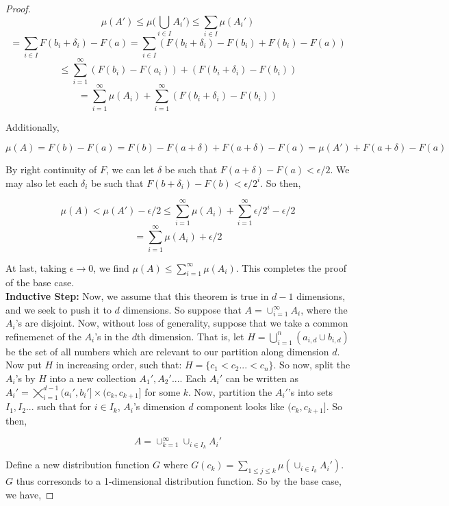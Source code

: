 \begin{proof}
   \[ \mu(A') \leq \mu\bigg(\bigcup_{i\in I}A_i' \bigg) \leq \sum_{i \in I} \mu(A_i') \] 
   \[ = \sum_{i \in I} F(b_i + \delta_i) - F(a) = \sum_{i \in I} (F(b_i + \delta_i) - F(b_i) + F(b_i) - F(a)) \]
   \[ \leq \sum_{i =1}^\infty (F(b_i) - F(a_i)) + (F(b_i + \delta_i) - F(b_i)) \] 
   \[ = \sum_{i =1}^\infty \mu(A_i) + \sum_{i =1}^\infty (F(b_i + \delta_i) - F(b_i))  \]

   Additionally, 

   \[ \mu(A) = F(b) - F(a) = F(b) - F(a + \delta) + F(a + \delta) - F(a) = \mu(A') + F(a + \delta) - F(a) \] 


   By right continuity of $F$, we can let $\delta$ be such that $F(a + \delta) - F(a) < \epsilon / 2$. 
   We may also let each $\delta_i$ be such that $F(b + \delta_i) - F(b) < \epsilon / 2^i$. So then, 

   \[ \mu(A) < \mu(A') - \epsilon/2 \leq \sum_{i =1}^\infty \mu(A_i) + \sum_{i =1}^\infty \epsilon / 2^i - \epsilon / 2 \]
   \[ = \sum_{i =1}^\infty \mu(A_i) + \epsilon / 2 \]

   At last, taking $\epsilon \to 0$, we find $\mu(A) \leq \sum_{i =1}^\infty \mu(A_i)$. This 
   completes the proof of the base case.\\

   \textbf{Inductive Step:} Now, we assume that this theorem is true in 
   $d-1$ dimensions, and we seek to push it to $d$ dimensions. So suppose that 
   $A = \cup_{i=1}^\infty A_i$, where the $A_i$'s are disjoint. Now, without loss of generality, 
   suppose that we take a common refinemenet of the $A_i$'s in the $d$th dimension. That is, 
   let $H = \bigcup_{i=1}^n (a_{i,d} \cup b_{i,d})$ be the set of all numbers which are relevant 
   to our partition along dimension $d$. Now put $H$ in increasing order, such that: 
   $H = \{c_1 < c_2... < c_n\}$. So now, split the $A_i$'s by $H$ into a new collection 
   $A_1', A_2'...$. Each $A_i'$ can be written as $A_i' = \bigtimes_{i=1}^{d-1} (a_i', b_i'] \times (c_k, c_{k+1}]$ 
   for some $k$. Now, partition the $A_i'$'s into sets $I_1, I_2...$ such that 
   for $i \in I_k$, $A_i$'s dimension $d$ component looks like $(c_k, c_{k+1}]$. So then, 

   \[ A = \cup_{k=1}^\infty \cup_{i \in I_k}A_i' \]

   Define a new distribution function $G$ where $G(c_k) = \sum_{1 \leq j \leq k} \mu(\cup_{i \in I_k}A_i')$. 
   $G$ thus corresonds to a 1-dimensional distribution function. So by the base case, 
   we have,


\end{proof}
